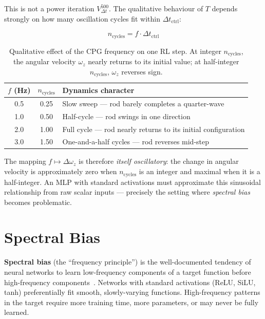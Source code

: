 \documentclass[11pt]{article}
\begin{document}
\noindent
This is not a power iteration $V_{\Delta t}^{500}$.
The qualitative behaviour of $T$ depends strongly on how many oscillation cycles
fit within $\Delta t_{\mathrm{ctrl}}$:

\begin{equation}
  n_{\mathrm{cycles}} = f \cdot \Delta t_{\mathrm{ctrl}}
  \label{eq:ncycles}
\end{equation}

\begin{table}[H]
  \centering
  \renewcommand{\arraystretch}{1.2}
  \begin{tabular}{ccl}
    \toprule
    $f$ (Hz) & $n_{\mathrm{cycles}}$ & Dynamics character \\
    \midrule
    0.5 & 0.25 & Slow sweep --- rod barely completes a quarter-wave \\
    1.0 & 0.50 & Half-cycle --- rod swings in one direction \\
    2.0 & 1.00 & Full cycle --- rod nearly returns to its initial configuration \\
    3.0 & 1.50 & One-and-a-half cycles --- rod reverses mid-step \\
    \bottomrule
  \end{tabular}
  \caption{Qualitative effect of the CPG frequency on one RL step.
    At integer $n_{\mathrm{cycles}}$, the angular velocity $\omega_z$ nearly
    returns to its initial value; at half-integer $n_{\mathrm{cycles}}$,
    $\omega_z$ reverses sign.}
  \label{tab:freq-regimes}
\end{table}

\noindent
The mapping $f \mapsto \Delta\omega_z$ is therefore \emph{itself oscillatory}:
the change in angular velocity is approximately zero when $n_{\mathrm{cycles}}$
is an integer and maximal when it is a half-integer.
An MLP with standard activations must approximate this sinusoidal relationship
from raw scalar inputs --- precisely the setting where \emph{spectral bias}
becomes problematic.

\section{Spectral Bias}
\label{sec:spectral-bias}

\textbf{Spectral bias} (the ``frequency principle'') is the well-documented
tendency of neural networks to learn low-frequency components of a target function
before high-frequency components~\cite{rahaman2019spectral}.
Networks with standard activations (ReLU, SiLU, tanh) preferentially fit smooth,
slowly-varying functions.
High-frequency patterns in the target require more training time, more parameters,
or may never be fully learned.
\end{document}
